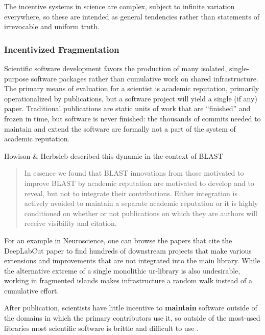 \documentclass[10pt]{article}
\begin{document}
\begin{multicols}{2}
 The incentive systems in science are complex, subject to
infinite variation everywhere, so these are intended as general
tendencies rather than statements of irrevocable and uniform truth.

\hypertarget{incentivized-fragmentation}{%
\subsubsection{Incentivized
Fragmentation}\label{incentivized-fragmentation}}

Scientific software development favors the production of many isolated,
single-purpose software packages rather than cumulative work on shared
infrastructure. The primary means of evaluation for a scientist is
academic reputation, primarily operationalized by publications, but a
software project will yield a single (if any) paper. Traditional
publications are static units of work that are ``finished'' and frozen
in time, but software is never finished: the thousands of commits needed
to maintain and extend the software are formally not a part of the
system of academic reputation.

Howison \& Herbsleb described this dynamic in the context of BLAST

\begin{quote}
In essence we found that BLAST innovations from those motivated to
improve BLAST by academic reputation are motivated to develop and to
reveal, but not to integrate their contributions. Either integration is
actively avoided to maintain a separate academic reputation or it is
highly conditioned on whether or not publications on which they are
authors will receive visibility and citation. \cite{howisonIncentivesIntegrationScientific2013} 
\end{quote}

For an example in Neuroscience, one can browse the papers that cite the
DeepLabCut paper \cite{mathisDeepLabCutMarkerlessPose2018a}  to
find hundreds of downstream projects that make various extensions and
improvements that are not integrated into the main library. While the
alternative extreme of a single monolithic ur-library is also
undesirable, working in fragmented islands makes infrastructure a random
walk instead of a cumulative effort.

After publication, scientists have little incentive to \textbf{maintain}
software outside of the domains in which the primary contributors use
it, so outside of the most-used libraries most scientific software is
brittle and difficult to use \cite{mangulImprovingUsabilityArchival2019, kumarBioinformaticsSoftwareBiologists2007} .


\end{multicols}
\end{document}
